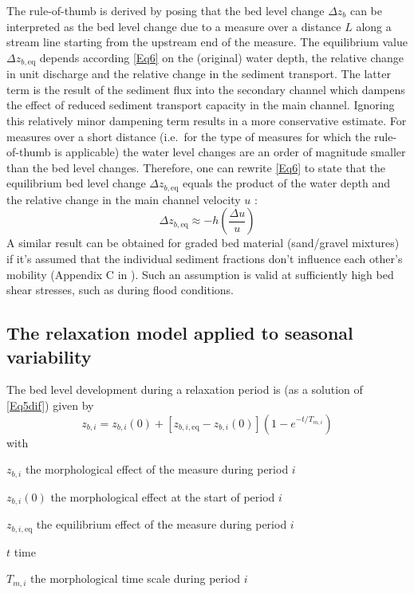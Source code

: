 The rule-of-thumb is derived by posing that the bed level change $\Delta z_b$ can be interpreted as the bed level change due to a measure over a distance $L$ along a stream line starting from the upstream end of the measure.
The equilibrium value $\Delta z_{b,\text{eq}}$ depends according \autoref{Eq6} on the (original) water depth, the relative change in unit discharge and the relative change in the sediment transport.
The latter term is the result of the sediment flux into the secondary channel which dampens the effect of reduced sediment transport capacity in the main channel.
Ignoring this relatively minor dampening term results in a more conservative estimate.
For measures over a short distance (i.e.~for the type of measures for which the rule-of-thumb is applicable) the water level changes are an order of magnitude smaller than the bed level changes.
Therefore, one can rewrite \autoref{Eq6} to state that the equilibrium bed level change $\Delta z_{b,\text{eq}}$ equals the product of the water depth and the relative change in the main channel velocity $u$ :
%
\begin{equation}
\Delta z_{b,\text{eq}} \approx -h \left ( \frac{\Delta u}{u} \right )
\label{Eq6v2}
\end{equation}
%
A similar result can be obtained for graded bed material (sand/gravel mixtures) if it's assumed that the individual sediment fractions don't influence each other's mobility (Appendix C in \citet{Waterdienst2008}).
Such an assumption is valid at sufficiently high bed shear stresses, such as during flood conditions.

\subsection{The relaxation model applied to seasonal variability}

The bed level development during a relaxation period is (as a solution of \autoref{Eq5dif}) given by
%
\begin{equation}
z_{b,i} = z_{b,i} (0) + [z_{b,i,\text{eq}} - z_{b,i}(0)](1 - e^{-t/T_{m,i}})
\label{Eq7}
\end{equation}
%
with
%
\begin{symbollist}
\item[$z_{b,i}$]  the morphological effect of the measure during period $i$
\item[$z_{b,i}(0)$]  the morphological effect at the start of period $i$
\item[$z_{b,i,\text{eq}}$]  the equilibrium effect of the measure during period $i$
\item[$t$]  time
\item[$T_{m,i}$]  the morphological time scale during period $i$
\end{symbollist}

